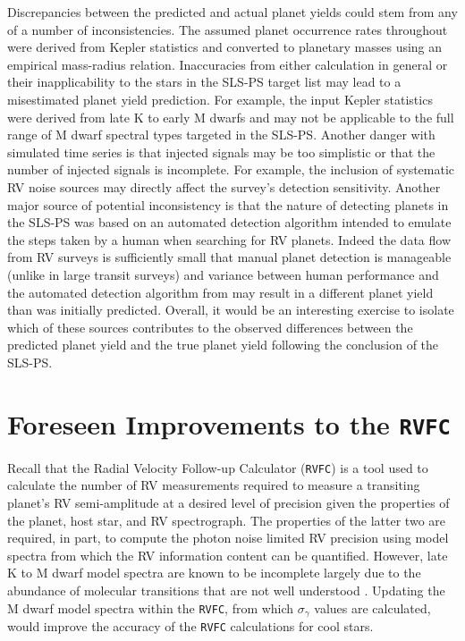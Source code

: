 Discrepancies between the predicted and actual planet yields could stem
from any of a number of inconsistencies. The assumed planet occurrence rates
throughout were derived from Kepler statistics and converted to planetary masses
using an empirical mass-radius relation. Inaccuracies from either calculation
in general or their inapplicability to the stars in the SLS-PS target list may
lead to a misestimated planet yield prediction. For example, the input Kepler
statistics were derived from late K to early M dwarfs \citep{dressing15a} and
may not be applicable to the full range of M dwarf spectral types targeted in
the SLS-PS. Another danger with simulated time series is that injected signals
may be too simplistic or that the number of injected signals is incomplete. For
example, the inclusion of systematic RV noise sources may directly affect the
survey's detection sensitivity. Another major source of potential inconsistency
is that the nature of detecting planets in the SLS-PS was based on an automated
detection algorithm intended to emulate the steps taken by a human when
searching for RV planets. Indeed the data flow from RV surveys is sufficiently
small that manual planet detection is manageable (unlike in large transit
surveys) and variance between human performance and the automated detection
algorithm from \cite{cloutier18a} may result in a different planet yield than
was initially predicted. Overall, it would be an interesting exercise to
isolate which of these sources contributes to the observed differences between
the predicted planet yield and the true planet yield following the conclusion
of the SLS-PS.

\section{Foreseen Improvements to the \texttt{RVFC}}
Recall that the Radial Velocity Follow-up Calculator (\texttt{RVFC}) is a tool
used to calculate the number of RV measurements required to measure a transiting
planet's RV semi-amplitude at a desired level of precision given the properties
of the planet, host star, and RV spectrograph. The properties of the latter two
are required, in part, to compute the photon noise limited RV precision using
model spectra from which the RV information content can be quantified. However,
late K to M dwarf model spectra are known to be incomplete largely due to the
abundance of molecular transitions that are not well understood
\citep{passegger16,behmard19}. Updating the M dwarf model spectra within the
\texttt{RVFC}, from which $\sigma_{\gamma}$ values are calculated, would improve
the accuracy of the \texttt{RVFC} calculations for cool stars. \\

